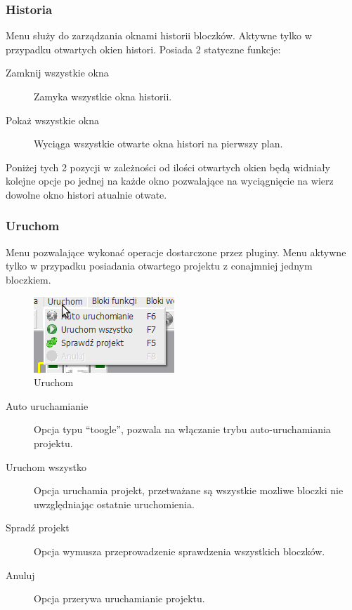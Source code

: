 \documentclass[a4paper,10pt]{article}
\begin{document}
\subsubsection{Historia}
Menu służy do zarządzania oknami historii bloczków. Aktywne tylko w przypadku otwartych okien histori. Posiada 2 statyczne funkcje:
\begin{description}
\item[Zamknij wszystkie okna] Zamyka wszystkie okna historii. 
\item[Pokaż wszystkie okna] Wyciąga wszystkie otwarte okna histori na pierwszy plan.
\end{description}
Poniżej tych 2 pozycji w zależności od ilości otwartych okien będą widniały kolejne opcje po jednej na każde okno pozwalające na wyciągnięcie na wierz dowolne okno histori atualnie otwate.

\subsubsection{Uruchom}
Menu pozwalające wykonać operacje dostarczone przez pluginy. Menu aktywne tylko w przypadku posiadania otwartego projektu z conajmniej jednym bloczkiem.
\begin{figure}[h]
 \centering
 \includegraphics[scale=0.5]{uruchom}
 \caption{Uruchom}
 \label{fig:Run}
\end{figure}
\begin{description}
\item [Auto uruchamianie] Opcja typu ``toogle'', pozwala na włączanie trybu auto-uruchamiania projektu.
\item [Uruchom wszystko] Opcja uruchamia projekt, przetważane są wszystkie mozliwe bloczki nie uwzględniając ostatnie uruchomienia.
\item [Spradź projekt] Opcja wymusza przeprowadzenie sprawdzenia wszystkich bloczków.
\item [Anuluj] Opcja przerywa uruchamianie projektu.
\end{description}
\end{document}
